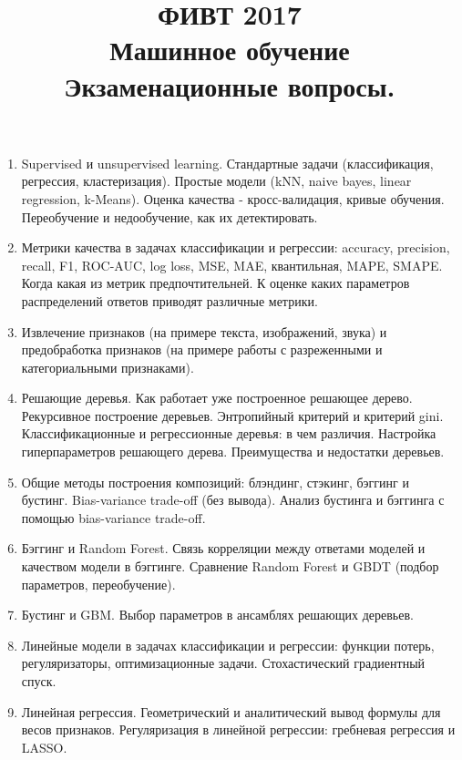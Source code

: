 \documentclass[15pt]{article}
\title{ФИВТ 2017 \\ Машинное обучение\\ Экзаменационные вопросы.}
\date{}
\begin{document}
\maketitle
\begin{enumerate}
  \item Supervised и unsupervised learning. Стандартные задачи (классификация, регрессия, кластеризация).
      Простые модели (kNN, naive bayes, linear regression, k-Means).
      Оценка качества - кросс-валидация, кривые обучения.
      Переобучение и недообучение, как их детектировать.

  \item Метрики качества в задачах классификации и регрессии: accuracy, precision, recall, F1, ROC-AUC, log loss, MSE, MAE, квантильная, MAPE, SMAPE.
      Когда какая из метрик предпочтительней.
      К оценке каких параметров распределений ответов приводят различные метрики.

  \item Извлечение признаков (на примере текста, изображений, звука) и предобработка признаков (на примере работы с разреженными и категориальными признаками).

  \item Решающие деревья. Как работает уже построенное решающее дерево.
      Рекурсивное построение деревьев.
      Энтропийный критерий и критерий gini.
      Классификационные и регрессионные деревья: в чем различия.
      Настройка гиперпараметров решающего дерева.
      Преимущества и недостатки деревьев.

  \item Общие методы построения композиций: блэндинг, стэкинг, бэггинг и бустинг.
      Bias-variance trade-off (без вывода).
      Анализ бустинга и бэггинга с помощью bias-variance trade-off.

  \item Бэггинг и Random Forest. Связь корреляции между ответами моделей и качеством модели в бэггинге.
      Сравнение Random Forest и GBDT (подбор параметров, переобучение).

  \item Бустинг и GBM. Выбор параметров в ансамблях решающих деревьев.
  
  \item Линейные модели в задачах классификации и регрессии: функции потерь, регуляризаторы, оптимизационные задачи.
      Стохастический градиентный спуск.

  \item Линейная регрессия. Геометрический и аналитический вывод формулы для весов признаков.
      Регуляризация в линейной регрессии: гребневая регрессия и LASSO.


\end{enumerate}
\end{document}
